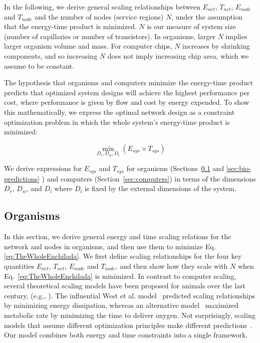 \documentclass[12pt]{article}
\begin{document}
In the following, we derive general scaling relationships between $E_{net}$,
$T_{net}$, $E_{node}$ and $T_{node}$ and the number of nodes (service
regions) $N$, under the assumption that the energy-time product is minimized.  $N$ is our
measure of system size (number of capillaries or number of transistors). In organisms, larger $N$
implies larger organism volume and mass. For computer chips, $N$ increases by
shrinking components, and so increasing $N$ does not imply increasing chip
area, which we assume to be constant.

The hypothesis that organisms and computers minimize the energy-time product
predicts that optimized system designs will achieve
the highest performance per cost, where performance is given by flow and cost
by energy expended.  To show this mathematically, 
we express the optimal network design as a constraint optimization problem in
which the whole system's energy-time product is minimized:

\begin{equation}
  \min_{D_r,D_w,D_l}(E_{sys} \times T_{sys})
\label{eq:TheWholeEnchilada}
\end{equation}

\noindent We derive expressions for $E_{sys}$ and $T_{sys}$ for organisms
(Sections~\ref{sec:organisms} and \ref{sec:bio-predictions} ) and computers (Section~\ref{sec:computers}) in terms of
the dimensions $D_r$, $D_w$, and $D_l$ where $D_l$ is fixed by the external
dimensions of the system.


\subsection{Organisms}
\label{sec:organisms}

In this section, we derive general energy and time scaling relations for the
network and nodes in organisms, and then use them to minimize Eq.
\ref{eq:TheWholeEnchilada}.  We first define scaling relationships for the four
key quantities $E_{net}$, $T_{net}$, $E_{node}$ and $T_{node}$, and
then show
how they scale with $N$ when Eq.~\ref{eq:TheWholeEnchilada} is minimized.
In contrast to computer scaling, several theoretical scaling models have been proposed for animals over the last century, (e.g., \cite{thompson1942arcy, west97, banavar1999size, dodds2010optimal, banavar10}). The influential West et al. model~\cite{west97} predicted
scaling relationships by minimizing energy dissipation,
whereas an alternative model~\cite{banavar10} maximized metabolic rate by minimizing the time to deliver oxygen. Not surprisingly, scaling models that assume different optimization principles make different predictions~\cite{newberry2015testing}.  Our model
combines both energy and time constraints into a single framework.
\end{document}
